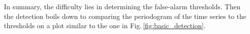 In summary, the difficulty lies in determining the false-alarm thresholds. Then the detection boils down to comparing the periodogram of the time series to the thresholds on a plot similar to the one in Fig.\,\ref{fig:basic_detection}.




